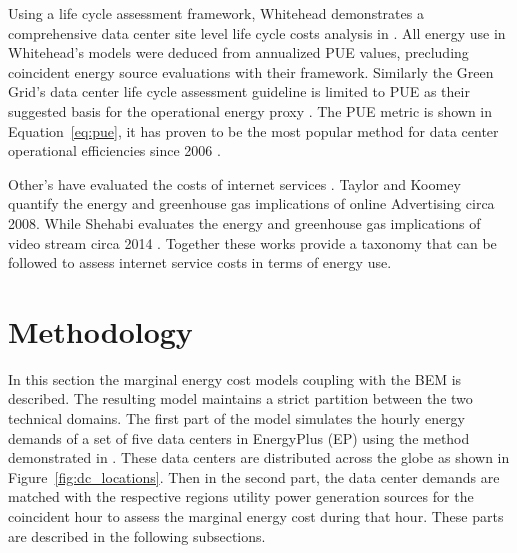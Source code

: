 Using a life cycle assessment framework, Whitehead demonstrates a comprehensive data center site level life cycle costs analysis in \cite{whitehead15}. All energy use in Whitehead’s models were deduced from annualized PUE values, precluding coincident energy source evaluations with their framework. Similarly the Green Grid’s data center life cycle assessment guideline is limited to PUE as their suggested basis for the operational energy proxy \cite{tgg12}. The PUE metric is shown in Equation~\ref{eq:pue}, it has proven to be the most popular method for data center operational efficiencies since 2006 \cite{wiki_pue}.



Other’s have evaluated the costs of internet services \cite{koomey08} \cite{shehabi14}. Taylor and Koomey quantify the energy and greenhouse gas implications of online Advertising circa 2008. While Shehabi evaluates the energy and greenhouse gas implications of video stream circa 2014 \cite{shehabi14}. Together these works provide a taxonomy that can be followed to assess internet service costs in terms of energy use. 

\section{Methodology}
In this section the marginal energy cost model\textsc{}s coupling with the BEM is described. The resulting model maintains a strict partition between the two technical domains. The first part of the model simulates the hourly energy demands of a set of five data centers in EnergyPlus (EP) using the method demonstrated in \cite{kumar20}. These data centers are distributed across the globe as shown in Figure~\ref{fig:dc_locations}. Then in the second part, the data center demands are matched with the respective region\textsc{}s utility power generation sources for the coincident hour to assess the marginal energy cost during that hour. These parts are described in the following subsections. 

